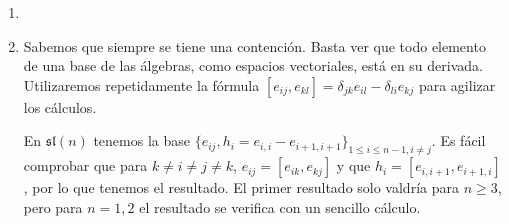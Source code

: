 \documentclass[twoside]{article}
\begin{document}
\begin{solucion}
\begin{enumerate}
\item[]
\item Sabemos que siempre se tiene una contención. Basta ver que todo elemento de una base de las álgebras, como espacios vectoriales, está en su derivada. Utilizaremos repetidamente la fórmula $[e_{ij},e_{kl}]=\delta_{jk}e_{il}-\delta_{li}e_{kj}$ para agilizar los cálculos.

En $\mathfrak{sl}(n)$ tenemos la base $\{e_{ij}, h_i=e_{i,i}-e_{i+1,i+1}\}_{1\leq i\leq n-1, i\neq j}$. Es fácil comprobar que para $k\neq i\neq j\neq k$, $e_{ij}=[e_{ik},e_{kj}]$ y que $h_i=[e_{i,i+1},e_{i+1,i}]$, por lo que tenemos el resultado. El primer resultado solo valdría para $n\geq 3$, pero para $n=1,2$ el resultado se verifica con un sencillo cálculo.
%
%
%
% 
%
%




\end{enumerate}
\end{solucion}
\end{document}
